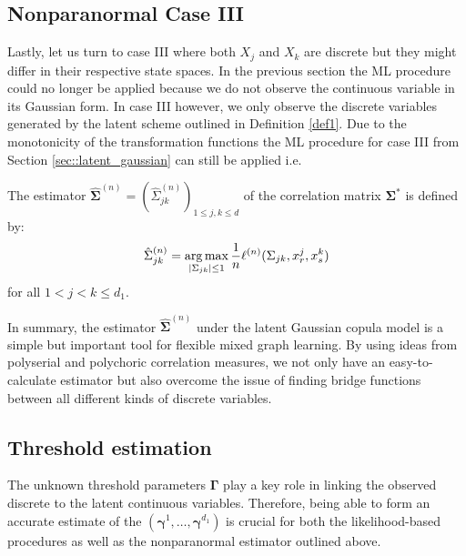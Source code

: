 \subsection{Nonparanormal Case III}\label{sec::nonparanormal_case3} 

Lastly, let us turn to case III where both $X_j$ and $X_k$ are discrete but they might differ in their respective state spaces. In the previous section the ML procedure could no longer be applied because we do not observe the continuous variable in its Gaussian form. In case III however, we only observe the discrete variables generated by the latent scheme outlined in Definition \ref{def1}. Due to the monotonicity of the transformation functions the ML procedure for case III from Section \ref{sec::latent_gaussian} can still be applied i.e.

\begin{definition}
    The estimator $\hat{\boldsymbol{\Sigma}}^{(n)} = (\hat{\Sigma}_{jk}^{(n)})_{1\leq j, k\leq d}$ of the correlation matrix $\boldsymbol{\Sigma}^*$ is defined by:
    \begin{equation}
            \hat{\Sigma}_{jk}^{(n)} = \argmax_{\Abs{\Sigma_{jk}} \leq 1} \frac{1}{n} \ell^{(n)}(\Sigma_{jk}, x^j_r,x^k_s)
    \end{equation}
    for all $1 < j < k \leq d_1 $. 
\end{definition}

In summary, the estimator $\hat{\boldsymbol{\Sigma}}^{(n)}$ under the latent Gaussian copula model is a simple but important tool for flexible mixed graph learning. By using ideas from polyserial and polychoric correlation measures, we not only have an easy-to-calculate estimator but also overcome the issue of finding bridge functions between all different kinds of discrete variables.

\subsection{Threshold estimation}\label{sec::thresholds}

The unknown threshold parameters $\boldsymbol{\Gamma}$ play a key role in linking the observed discrete to the latent continuous variables. Therefore, being able to form an accurate estimate of the $(\boldsymbol{\gamma}^1, \dots, \boldsymbol{\gamma}^{d_1})$ is crucial for both the likelihood-based procedures as well as the nonparanormal estimator outlined above. 

